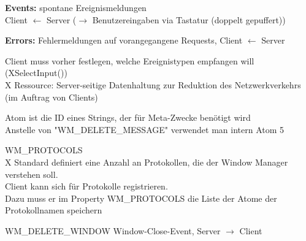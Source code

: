 \begin{multicols*}{5}
\textbf{Events:} spontane Ereignismeldungen\\
Client $\leftarrow$ Server ($\rightarrow$ Benutzereingaben via Tastatur (doppelt gepuffert))

\textbf{Errors:} Fehlermeldungen auf vorangegangene Requests, Client $\leftarrow$ Server

\textcolor{h}{Client} muss vorher festlegen, welche Ereignistypen empfangen will (XSelectInput())\\
\textcolor{h}{X Ressource:} Server-seitige Datenhaltung zur Reduktion des Netzwerkverkehrs (im Auftrag von Clients)

\textcolor{h}{Atom} ist die ID eines Strings, der für Meta-Zwecke benötigt wird\\
Anstelle von "WM\_DELETE\_MESSAGE" verwendet man intern Atom 5

\textcolor{h}{WM\_PROTOCOLS}\\
X Standard definiert eine Anzahl an Protokollen, die der Window Manager verstehen soll.\\
Client kann sich für Protokolle registrieren.\\
Dazu muss er im Property WM\_PROTOCOLS die Liste der Atome der Protokollnamen speichern

\textcolor{h}{WM\_DELETE\_WINDOW}
Window-Close-Event, Server $\rightarrow$ Client




\end{multicols*}





% 



